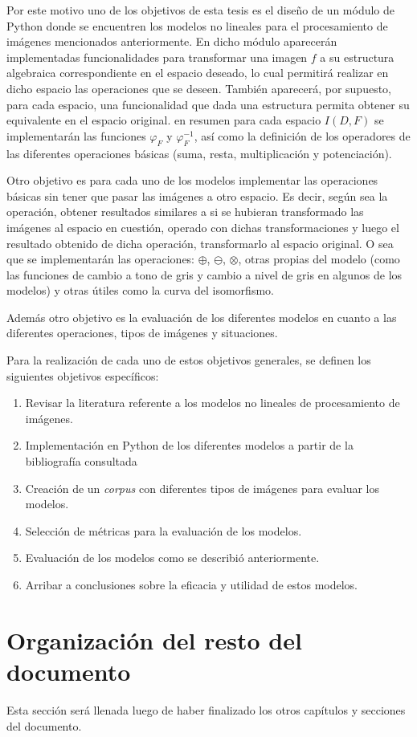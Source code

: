 Por este motivo uno de los objetivos de esta tesis es el dise\~no de un m\'odulo de Python donde se encuentren los modelos no lineales para el procesamiento de im\'agenes mencionados anteriormente. En dicho m\'odulo aparecer\'an implementadas funcionalidades para transformar una imagen $f$ a su estructura algebraica correspondiente en el espacio deseado, lo cual permitir\'a realizar en dicho espacio las operaciones que se deseen. Tambi\'en aparecer\'a, por supuesto, para cada espacio, una funcionalidad que dada una estructura permita obtener su equivalente en el espacio original. en resumen para cada espacio $I(D,F)$ se implementar\'an las funciones $\varphi_F$ y $\varphi^{-1}_F$, as\'i como la definici\'on de los operadores de las diferentes operaciones b\'asicas (suma, resta, multiplicaci\'on y potenciaci\'on).

Otro objetivo es para cada uno de los modelos implementar las operaciones b\'asicas sin tener que pasar las im\'agenes a otro espacio. Es decir, seg\'un sea la operaci\'on, obtener resultados similares a si se hubieran transformado las im\'agenes al espacio en cuesti\'on, operado con dichas transformaciones y luego el resultado obtenido de dicha operaci\'on, transformarlo al espacio original. O sea que se implementar\'an las operaciones: $\oplus$, $\ominus$, $\otimes$, otras propias del modelo (como las funciones de cambio a tono de gris y cambio a nivel de gris en algunos de los modelos) y otras \'utiles como la curva del isomorfismo.

Adem\'as otro objetivo es la evaluaci\'on de los diferentes modelos en cuanto a las diferentes operaciones, tipos de im\'agenes y situaciones.

Para la realizaci\'on de cada uno de estos objetivos generales, se definen los siguientes objetivos espec\'ificos:

\begin{enumerate}
	\item Revisar la literatura referente a los modelos no lineales de procesamiento de im\'agenes.
	\item Implementaci\'on en Python de los diferentes modelos a partir de la bibliograf\'ia consultada
	\item Creaci\'on de un \textit{corpus} con diferentes tipos de im\'agenes para evaluar los modelos.
	\item Selecci\'on de m\'etricas para la evaluaci\'on de los modelos.
	\item Evaluaci\'on de los modelos como se describi\'o anteriormente.
	\item Arribar a conclusiones sobre la eficacia y utilidad de estos modelos. 
\end{enumerate}

\section*{Organizaci\'on del resto del documento}

Esta secci\'on ser\'a llenada luego de haber finalizado los otros cap\'itulos y secciones del documento.